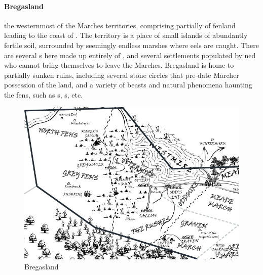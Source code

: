 \paragraph{Bregasland} the westernmost of the Marches territories, comprising partially of fenland leading to the coast of . The territory is a place of small islands of abundantly fertile soil, surrounded by seemingly endless marshes where eels are caught. There are several s here made up entirely of , and several settlements populated by ned who cannot bring themselves to leave the Marches. Bregasland is home to partially sunken ruins, including several stone circles that pre-date Marcher possession of the land, and a variety of beasts and natural phenomena haunting the fens, such as s, s, etc. \begin{figure}\centering\includegraphics[width=19.5cm,angle=90]{atlasofthemarches/Bregasland}\caption{Bregasland}\end{figure}
